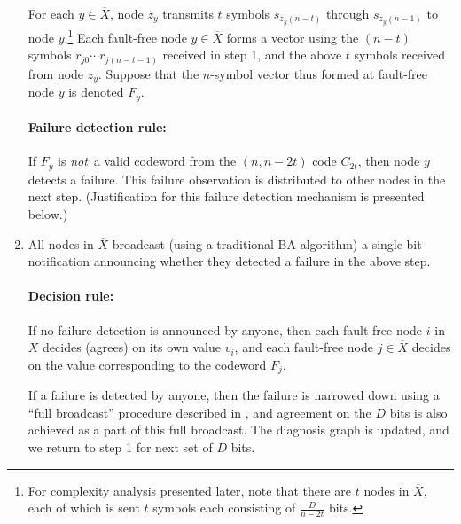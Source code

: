 \documentclass[12pt]{article}
\newcommand{\Xbar}{{\overline X}}
\begin{document}
\begin{enumerate}
For each $y\in \Xbar$,
node $z_y$ transmits $t$ symbols $s_{z_y(n-t)}$ through $s_{z_y(n-1)}$ to node
$y$.\footnote{For complexity analysis presented later, note that there are $t$ nodes in $\Xbar$,
each of which is sent $t$ symbols each consisting of $\frac{D}{n-2t}$ bits.}
Each fault-free node $y\in \Xbar$ 
forms a vector using the $(n-t)$ symbols $r_{j0}\cdots r_{j(n-t-1)}$
received in step 1, and the above $t$ symbols received from node $z_y$.
Suppose that the $n$-symbol vector thus formed at fault-free node $y$ is
denoted $F_y$.

\paragraph{Failure detection rule:}
If $F_y$ is {\em not}\, a valid codeword from the $(n,n-2t)$ code $C_{2t}$, then
node $y$ detects a failure. This failure observation is distributed
to other nodes in the next step. (Justification for this failure detection
mechanism is presented below.)

\item All nodes in $\Xbar$ broadcast (using a traditional BA algorithm)
a single bit notification announcing whether they detected a failure
in the above step.

\paragraph{Decision rule:}
If no failure detection is announced by anyone, then each fault-free node $i$ in $X$
decides (agrees) on its own value $v_i$, and each fault-free node $j\in \Xbar$ decides
on the value corresponding to the codeword $F_j$.

If a failure is detected by anyone, then the failure is narrowed down using
a ``full broadcast'' procedure described in \cite{techreport_BA_complexity}, and agreement on the $D$ bits is also achieved
as a part of this full broadcast. The diagnosis graph is updated, and we return
to step 1 for next set of $D$ bits. 

\end{enumerate}
\end{document}
